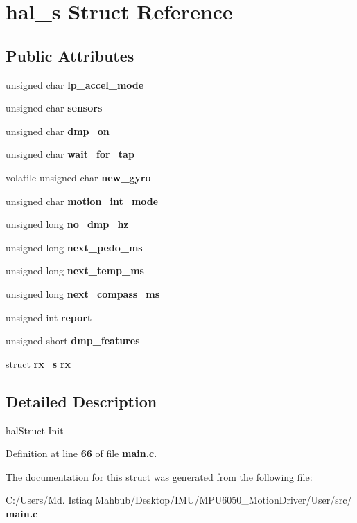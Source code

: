 \section{hal\+\_\+s Struct Reference}
\label{structhal__s}
\subsection*{Public Attributes}
\begin{DoxyCompactItemize}
\item 
unsigned char \textbf{ lp\+\_\+accel\+\_\+mode}
\item 
unsigned char \textbf{ sensors}
\item 
unsigned char \textbf{ dmp\+\_\+on}
\item 
unsigned char \textbf{ wait\+\_\+for\+\_\+tap}
\item 
volatile unsigned char \textbf{ new\+\_\+gyro}
\item 
unsigned char \textbf{ motion\+\_\+int\+\_\+mode}
\item 
unsigned long \textbf{ no\+\_\+dmp\+\_\+hz}
\item 
unsigned long \textbf{ next\+\_\+pedo\+\_\+ms}
\item 
unsigned long \textbf{ next\+\_\+temp\+\_\+ms}
\item 
unsigned long \textbf{ next\+\_\+compass\+\_\+ms}
\item 
unsigned int \textbf{ report}
\item 
unsigned short \textbf{ dmp\+\_\+features}
\item 
struct \textbf{ rx\+\_\+s} \textbf{ rx}
\end{DoxyCompactItemize}


\subsection{Detailed Description}
hal\+Struct Init 

Definition at line \textbf{ 66} of file \textbf{ main.\+c}.



The documentation for this struct was generated from the following file\+:\begin{DoxyCompactItemize}
\item 
C\+:/\+Users/\+Md. Istiaq Mahbub/\+Desktop/\+I\+M\+U/\+M\+P\+U6050\+\_\+\+Motion\+Driver/\+User/src/\textbf{ main.\+c}\end{DoxyCompactItemize}
